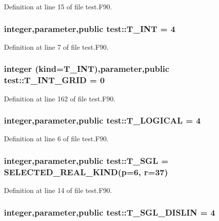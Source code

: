 Definition at line 15 of file test.F90.

\hypertarget{namespacetest_a6f91ebd89b58cfcc5da99faed9385c1e}{
\subsubsection[{T\_\-INT}]{\setlength{\rightskip}{0pt plus 5cm}integer,parameter,public {\bf test::T\_\-INT} = 4}}
\label{namespacetest_a6f91ebd89b58cfcc5da99faed9385c1e}


Definition at line 7 of file test.F90.

\hypertarget{namespacetest_a6b23ea23fb5d02c95f52b7d39ab348fe}{
\subsubsection[{T\_\-INT\_\-GRID}]{\setlength{\rightskip}{0pt plus 5cm}integer (kind={\bf T\_\-INT}),parameter,public {\bf test::T\_\-INT\_\-GRID} = 0}}
\label{namespacetest_a6b23ea23fb5d02c95f52b7d39ab348fe}


Definition at line 162 of file test.F90.

\hypertarget{namespacetest_acdeac586276a7d1d394fb5eddc77fc3d}{
\subsubsection[{T\_\-LOGICAL}]{\setlength{\rightskip}{0pt plus 5cm}integer,parameter,public {\bf test::T\_\-LOGICAL} = 4}}
\label{namespacetest_acdeac586276a7d1d394fb5eddc77fc3d}


Definition at line 6 of file test.F90.

\hypertarget{namespacetest_a04d8b9090502de3a00046fe904bc3d99}{
\subsubsection[{T\_\-SGL}]{\setlength{\rightskip}{0pt plus 5cm}integer,parameter,public {\bf test::T\_\-SGL} = SELECTED\_\-REAL\_\-KIND(p=6, r=37)}}
\label{namespacetest_a04d8b9090502de3a00046fe904bc3d99}


Definition at line 14 of file test.F90.

\hypertarget{namespacetest_ade95807442cb41fc39b288b86e82bccd}{
\subsubsection[{T\_\-SGL\_\-DISLIN}]{\setlength{\rightskip}{0pt plus 5cm}integer,parameter,public {\bf test::T\_\-SGL\_\-DISLIN} = 4}}
\label{namespacetest_ade95807442cb41fc39b288b86e82bccd}


